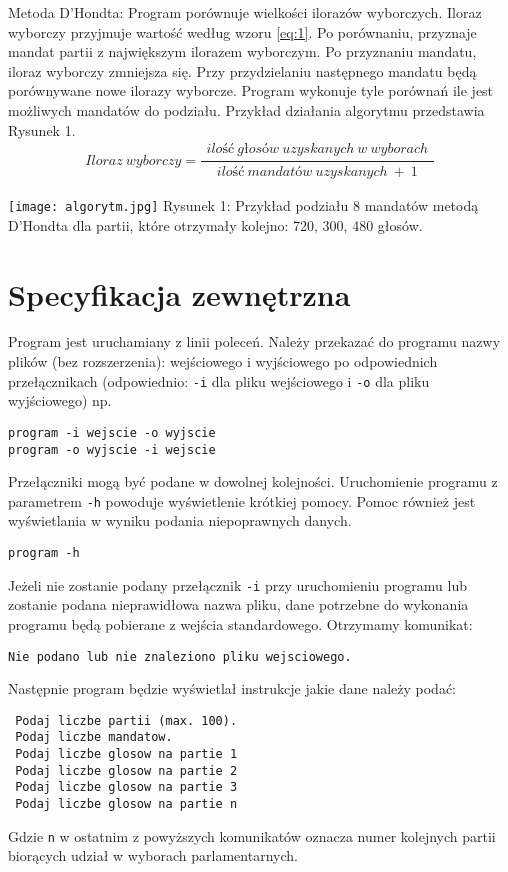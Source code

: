 \documentclass[12pt,a4paper]{article}
\begin{document}
Metoda D'Hondta:
Program porównuje wielkości ilorazów wyborczych. Iloraz wyborczy przyjmuje wartość według wzoru \eqref{eq:1}. Po porównaniu, przyznaje mandat partii z największym ilorazem wyborczym. Po przyznaniu mandatu, iloraz wyborczy zmniejsza się. Przy przydzielaniu następnego mandatu będą porównywane nowe ilorazy wyborcze. Program wykonuje tyle porównań ile jest możliwych mandatów do podziału.
Przykład działania algorytmu przedstawia Rysunek 1.
\centering
\begin{equation}
Iloraz \ wyborczy = 
\frac{\substack{ilość\ głosów\ uzyskanych\ w\ wyborach}}
{\substack{ilość\ mandatów\ uzyskanych\ +\ 1}}
\label{eq:1}
\end{equation}

\texttt{[image: algorytm.jpg]}
Rysunek 1: Przykład podziału 8 mandatów metodą D'Hondta dla partii, które otrzymały kolejno: 720, 300, 480 głosów.

\section{Specyfikacja zewnętrzna}
\label{sec:sp:zewnetrzna}
Program jest uruchamiany z linii poleceń. 
Należy przekazać do programu nazwy plików (bez rozszerzenia): wejściowego i wyjściowego po odpowiednich przełącznikach (odpowiednio: \texttt{-i} dla pliku wejściowego i \texttt{-o} dla pliku wyjściowego) np.
\begin{verbatim}
program -i wejscie -o wyjscie
program -o wyjscie -i wejscie
\end{verbatim}
Przełączniki mogą być podane w dowolnej kolejności. Uruchomienie programu z parametrem \texttt{-h} powoduje wyświetlenie krótkiej pomocy. Pomoc również jest wyświetlania w wyniku podania niepoprawnych danych.
\begin{verbatim}
program -h
\end{verbatim}

Jeżeli nie zostanie podany przełącznik \texttt{-i} przy uruchomieniu programu lub zostanie podana nieprawidłowa nazwa pliku, dane potrzebne do wykonania programu będą pobierane z wejścia standardowego. Otrzymamy komunikat:
\begin{verbatim}
Nie podano lub nie znaleziono pliku wejsciowego.
\end{verbatim}
Następnie program będzie wyświetlał instrukcje jakie dane należy podać:
\begin{verbatim}
 Podaj liczbe partii (max. 100).
 Podaj liczbe mandatow.
 Podaj liczbe glosow na partie 1
 Podaj liczbe glosow na partie 2
 Podaj liczbe glosow na partie 3
 Podaj liczbe glosow na partie n
\end{verbatim}
Gdzie \texttt{n} w ostatnim z powyższych komunikatów oznacza numer kolejnych partii biorących udział w wyborach parlamentarnych.
\end{document}
